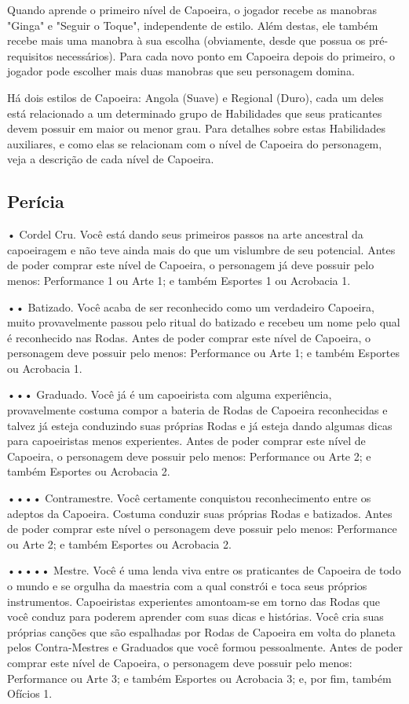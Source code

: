
Quando aprende o primeiro nível de Capoeira, o jogador recebe as manobras "Ginga" e "Seguir o Toque", independente de estilo. Além destas, ele também recebe mais uma manobra à sua escolha (obviamente, desde que possua os pré-requisitos necessários). Para cada novo ponto em Capoeira depois do primeiro, o jogador pode escolher mais duas manobras que seu personagem domina.

Há dois estilos de Capoeira: Angola (Suave) e Regional (Duro), cada um deles está relacionado a um determinado grupo de Habilidades que seus praticantes devem possuir em maior ou menor grau. Para detalhes sobre estas Habilidades auxiliares, e como elas se relacionam com o nível de Capoeira do personagem, veja a descrição de cada nível de Capoeira.

\subsection{Perícia}
• Cordel Cru. Você está dando seus primeiros passos na arte ancestral da capoeiragem e não teve ainda mais do que um vislumbre de seu potencial. Antes de poder comprar este nível de Capoeira, o personagem já deve possuir pelo menos: Performance 1 ou Arte 1; e também Esportes 1 ou Acrobacia 1.

•• Batizado. Você acaba de ser reconhecido como um verdadeiro Capoeira, muito provavelmente passou pelo ritual do batizado e recebeu um nome pelo qual é reconhecido nas Rodas. Antes de poder comprar este nível de Capoeira, o personagem deve possuir pelo menos: Performance ou Arte 1; e também Esportes ou Acrobacia 1.

••• Graduado. Você já é um capoeirista com alguma experiência, provavelmente costuma compor a bateria de Rodas de Capoeira reconhecidas e talvez já esteja conduzindo suas próprias Rodas e já esteja dando algumas dicas para capoeiristas menos experientes. Antes de poder comprar este nível de Capoeira, o personagem deve possuir pelo menos: Performance ou Arte 2; e também Esportes ou Acrobacia 2.


•••• Contramestre. Você certamente conquistou reconhecimento entre os adeptos da Capoeira. Costuma conduzir suas próprias Rodas e batizados. Antes de poder comprar este nível o personagem deve possuir pelo menos: Performance ou Arte 2; e também Esportes ou Acrobacia 2.


••••• Mestre. Você é uma lenda viva entre os praticantes de Capoeira de todo o mundo e se orgulha da maestria com a qual constrói e toca seus próprios instrumentos. Capoeiristas experientes amontoam-se em torno das Rodas que você conduz para poderem aprender com suas dicas e histórias. Você cria suas próprias canções que são espalhadas por Rodas de Capoeira em volta do planeta pelos Contra-Mestres e Graduados que você formou pessoalmente. Antes de poder comprar este nível de Capoeira, o personagem deve possuir pelo menos: Performance ou Arte 3; e também Esportes ou Acrobacia 3; e, por fim, também Ofícios 1.

